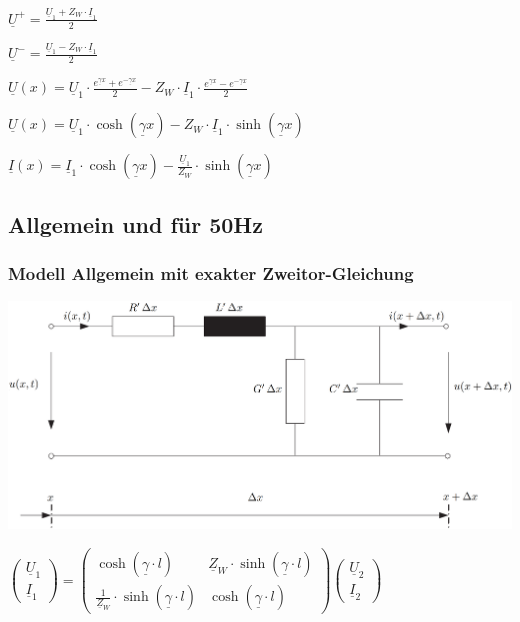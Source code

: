 $
\boxed{\underline{U}^+ = \frac{\underline{U}_1 + Z_W \cdot \underline{I}_1}{2}}
$

$
\boxed{\underline{U}^- = \frac{\underline{U}_1 - Z_W \cdot \underline{I}_1}{2}}
$

$
\boxed{\underline{U}(x) = \underline{U}_1 \cdot \frac{e^{\underline{\gamma} x} + e^{-\underline{\gamma} x}}{2} 
- Z_W \cdot \underline{I}_1 \cdot \frac{e^{\underline{\gamma} x} - e^{-\underline{\gamma} x}}{2}}
$

$
\boxed{\underline{U}(x) = \underline{U}_1 \cdot \cosh(\underline{\gamma} x) 
- Z_W \cdot \underline{I}_1 \cdot \sinh(\underline{\gamma} x)}
$

$
\boxed{\underline{I}(x) = \underline{I}_1 \cdot \cosh(\underline{\gamma} x) 
- \frac{\underline{U}_1}{Z_W} \cdot \sinh(\underline{\gamma} x)}
$


\newcolumn
\subsection{Allgemein und für 50Hz}
\subsubsection{Modell Allgemein mit exakter Zweitor-Gleichung}

\includegraphics[width=0.98\columnwidth, align=c]{images/Leitungsgleichungen_1.png}

\vspace{0.15cm}

$\boxed{
\begin{pmatrix}
    \underline{U}_1 \\
    \underline{I}_1
    \end{pmatrix}
    =
    \begin{pmatrix}
    \cosh(\underline{\gamma} \cdot l) & \underline{Z}_W \cdot \sinh(\underline{\gamma} \cdot l) \\
    \frac{1}{\underline{Z}_W} \cdot \sinh(\underline{\gamma} \cdot l) & \cosh(\underline{\gamma} \cdot l)
    \end{pmatrix}
    \begin{pmatrix}
    \underline{U}_2 \\
    \underline{I}_2
\end{pmatrix}}
$

